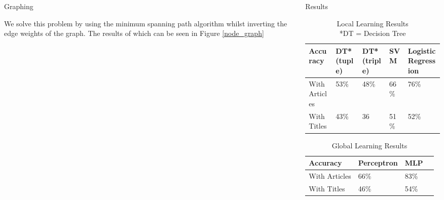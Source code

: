 \documentclass[final]{beamer}
\newlength{\onecolwid}
\newlength{\twocolwid}
\begin{document}
\begin{frame}[t]
\begin{columns}[t]
\begin{column}{\twocolwid}
\begin{columns}[t,totalwidth=\twocolwid]
\begin{column}{\onecolwid}
\begin{block}{Graphing}
  \vspace{1em}

  We solve this problem by using the minimum spanning path algorithm whilst inverting the edge weights
  of the graph. The results of which can be seen in Figure \ref{node_graph}
\end{block}


\end{column} %

\begin{column}{\onecolwid} %


\begin{block}{Results}


\begin{table}[H]
\centering
\label{table:local-learning}
\begin{tabular}{|p{5em}|l|l|l|p{4em}|}
  \hline
  {\small Accuracy}  & {\small DT* (tuple)} & {\small DT* (triple)} & {\small SVM}  & {\small Logistic Regression}\\
  \hline
{\small With Articles}    & 53\%  & 48\%    & 66\% &  76\% \\
\hline
{\small With Titles} & 43\%  & 36& 51\%    & 52\% \\
\hline
\end{tabular}
\caption{Local Learning Results  \\*DT = Decision Tree \endtabular}
\end{table}

\begin{table}[H]
\centering
\label{table:global-learning}
\begin{tabular}{|p{5em}|l|l|p{4em}|}
  \hline
  {\small Accuracy}  & {\small Perceptron} & {\small MLP}\\
  \hline
{\small With Articles}    & 66\%  & 83\%\\
\hline
{\small With Titles} & 46\%  & 54\%\\
\hline
\end{tabular}
\caption{Global Learning Results}
\end{table}




\end{block}
\end{column}
\end{columns}
\end{column}
\end{columns}
\end{frame}
\end{document}
